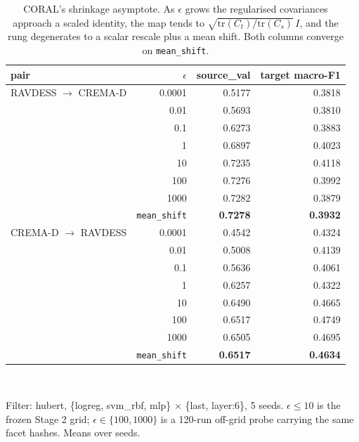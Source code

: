 \begin{table}[!t]
  \centering
  \caption{CORAL's shrinkage asymptote. As $\epsilon$ grows the regularised covariances approach a scaled identity, the map tends to $\sqrt{\mathrm{tr}(C_t)/\mathrm{tr}(C_s)}\,I$, and the rung degenerates to a scalar rescale plus a mean shift. Both columns converge on \texttt{mean\_shift}.}
  \label{tab:eps}
  \begin{tabular}{lrrr}
    \toprule
    pair & $\epsilon$ & source\_val & target macro-F1 \\
    \midrule
    RAVDESS $\rightarrow$ CREMA-D & 0.0001 & 0.5177 & 0.3818 \\
     & 0.01 & 0.5693 & 0.3810 \\
     & 0.1 & 0.6273 & 0.3883 \\
     & 1 & 0.6897 & 0.4023 \\
     & 10 & 0.7235 & 0.4118 \\
     & 100 & 0.7276 & 0.3992 \\
     & 1000 & 0.7282 & 0.3879 \\
     & \texttt{mean\_shift} & \textbf{0.7278} & \textbf{0.3932} \\
    CREMA-D $\rightarrow$ RAVDESS & 0.0001 & 0.4542 & 0.4324 \\
     & 0.01 & 0.5008 & 0.4139 \\
     & 0.1 & 0.5636 & 0.4061 \\
     & 1 & 0.6257 & 0.4322 \\
     & 10 & 0.6490 & 0.4665 \\
     & 100 & 0.6517 & 0.4749 \\
     & 1000 & 0.6505 & 0.4695 \\
     & \texttt{mean\_shift} & \textbf{0.6517} & \textbf{0.4634} \\
    \bottomrule
  \end{tabular}
  \\[2pt]
  \begin{minipage}{\linewidth}\footnotesize Filter: hubert, \{logreg, svm\_rbf, mlp\} $\times$ \{last, layer:6\}, 5 seeds. $\epsilon \leq 10$ is the frozen Stage 2 grid; $\epsilon \in \{100, 1000\}$ is a 120-run off-grid probe carrying the same facet hashes. Means over seeds.\end{minipage}
\end{table}
